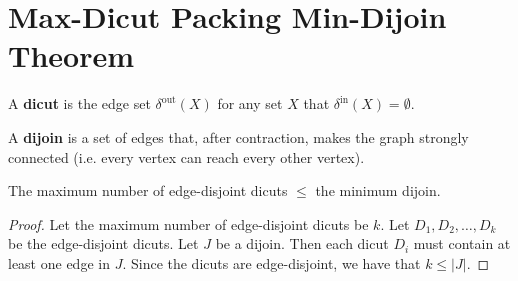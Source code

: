 \section{Max-Dicut Packing Min-Dijoin Theorem}

\begin{definition}
	A \textbf{dicut} is the edge set $\delta^{\text{out}}(X)$ for any set $X$ that $\delta^{\text{in}}(X) = \emptyset$.

	A \textbf{dijoin} is a set of edges that, after contraction, makes the graph strongly connected (i.e. every vertex can reach every other vertex).
\end{definition}

\begin{claim}
	The maximum number of edge-disjoint dicuts $\le$ the minimum dijoin.
\end{claim}
\begin{proof}
	Let the maximum number of edge-disjoint dicuts be $k$. Let $D_1, D_2, \ldots, D_k$ be the edge-disjoint dicuts. Let $J$ be a dijoin. Then each dicut $D_i$ must contain at least one edge in $J$. Since the dicuts are edge-disjoint, we have that $k \leq |J|$.
\end{proof}
